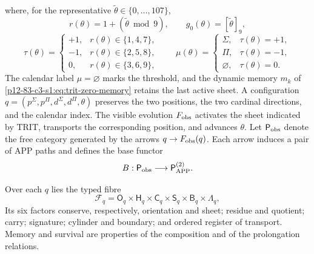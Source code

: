 where, for the representative
\(\widetilde\theta\in\{0,\ldots,107\}\),
\[
r(\theta)=1+(\widetilde\theta\bmod9),
\qquad g_0(\theta)=[\widetilde\theta]_9,
\]
\[
\tau(\theta)=
\begin{cases}
+1,&r(\theta)\in\{1,4,7\},\\
-1,&r(\theta)\in\{2,5,8\},\\
0,&r(\theta)\in\{3,6,9\},
\end{cases}
\qquad
\mu(\theta)=
\begin{cases}
\Sigma,&\tau(\theta)=+1,\\
\Pi,&\tau(\theta)=-1,\\
\varnothing,&\tau(\theta)=0.
\end{cases}
\]
The calendar label \(\mu=\varnothing\) marks the threshold, and the dynamic memory \(m_k\) of \eqref{p12-83-c3-s1:eq:trit-zero-memory} retains the last active sheet. A configuration \(q=(p^\Sigma,p^\Pi,d^\Sigma,d^\Pi,\theta)\) preserves the two positions, the two cardinal directions, and the calendar index. The visible evolution \(F_{\rm obs}\) activates the sheet indicated by TRIT, transports the corresponding position, and advances \(\theta\). Let \(\mathsf P_{\rm obs}\) denote the free category generated by the arrows \(q\to F_{\rm obs}(q)\). Each arrow induces a pair of APP paths and defines the base functor
\begin{equation}
B:\mathsf P_{\rm obs}\longrightarrow\mathsf P_{\rm APP}^{(2)}.
\label{p12-83-c3-s1:eq:tpk-bivariant-base-functor}
\end{equation}

Over each \(q\) lies the typed fibre
\begin{equation}
\mathcal F_q=
\mathsf O_q\times\mathsf H_q\times\mathsf C_q\times\mathsf S_q
\times\mathsf B_q\times\mathsf\Lambda_q,
\label{p12-83-c3-s1:eq:tpk-fiber}
\end{equation}
Its six factors conserve, respectively, orientation and sheet; residue and
quotient; carry; signature; cylinder and boundary; and ordered register of
transport. Memory and survival are properties of the composition and of
the prolongation relations.

